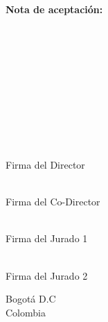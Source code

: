 \newpage
\thispagestyle{empty}
\begin{flushright}
    \noindent
    {\fontsize{14}{17}\selectfont \textbf{Nota de aceptación:}}
    
    \vspace{0.5cm}
    
    \noindent\makebox[0.7\textwidth]{\hrulefill}\\[0.2cm]
    \noindent\makebox[0.7\textwidth]{\hrulefill}\\[0.2cm]
    \noindent\makebox[0.7\textwidth]{\hrulefill}\\[0.2cm]
    \noindent\makebox[0.7\textwidth]{\hrulefill}\\[0.2cm]
    \noindent\makebox[0.7\textwidth]{\hrulefill}\\[0.2cm]
    \noindent\makebox[0.7\textwidth]{\hrulefill}\\[0.2cm]
    \noindent\makebox[0.7\textwidth]{\hrulefill}\\[0.2cm]
    \noindent\makebox[0.7\textwidth]{\hrulefill}\\[0.2cm]    
    
    \vspace{1.5cm}
    
    \noindent\makebox[0.7\textwidth]{\hrulefill}\\
    Firma del Director
    
    \vspace{1cm}
    
    \noindent\makebox[0.7\textwidth]{\hrulefill}\\
    Firma del Co-Director
    
    \vspace{1cm}
    
    \noindent\makebox[0.7\textwidth]{\hrulefill}\\
    Firma del Jurado 1
    
    \vspace{1cm}
    
    \noindent\makebox[0.7\textwidth]{\hrulefill}\\
    Firma del Jurado 2
    
    \vfill
\end{flushright}
\noindent
Bogotá D.C\\
Colombia\\
\proyectoFechaCompleta
 \vspace{1cm}
